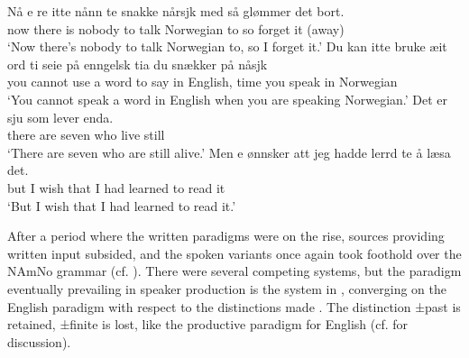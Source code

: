 \documentclass[output=paper]{langscibook}
\begin{document}
\ea%
    \label{ex:eide:27}
    \ea  
    \gll  Nå {e re} itte nånn te snakke nårsjk med så glømmer det bort.  \\
          now there is nobody to talk Norwegian to so forget it (away)   \\
    \glt ‘Now there’s nobody to talk Norwegian to, so I forget it.’
    \ex  
    \gll Du {kan itte} bruke æit ord ti seie på enngelsk tia du snækker på nåsjk\\
          you cannot use a word to say in English, time you speak in Norwegian\\
    \glt ‘You cannot speak a word in English when you are speaking Norwegian.’
    \ex  
    \gll  Det er sju som lever enda. \\
          there are seven who live still\\
    \glt ‘There are seven who are still alive.’
    \ex  
    \gll Men e ønnsker att jeg hadde lerrd {te å} læsa det. \\
         but I wish that I had learned to read it\\
    \glt ‘But I wish that I had learned to read it.’
    \z %
\z

After a period where the written paradigms were on the rise, sources providing written input subsided, and the spoken variants once again took foothold over the NAmNo grammar (cf. \citealt{EideHjelde2023}). There were several competing systems, but the paradigm eventually prevailing in speaker production is the system in , converging on the English paradigm with respect to the distinctions made . The distinction ±past is retained, ±finite is lost, like the productive paradigm for English (cf. \citealt{Eide2016} for discussion). 
\end{document}
